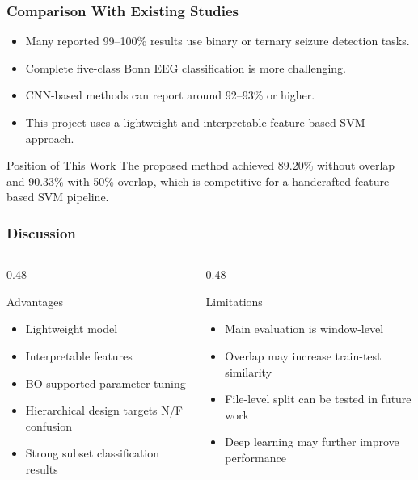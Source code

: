 \documentclass{beamer}
\begin{document}
\begin{frame}
\frametitle{Comparison With Existing Studies}
\begin{itemize}
\item Many reported 99--100\% results use binary or ternary seizure detection tasks.
\item Complete five-class Bonn EEG classification is more challenging.
\item CNN-based methods can report around 92--93\% or higher.
\item This project uses a lightweight and interpretable feature-based SVM approach.
\end{itemize}

\begin{block}{Position of This Work}
The proposed method achieved 89.20\% without overlap and 90.33\% with 50\% overlap, which is competitive for a handcrafted feature-based SVM pipeline.
\end{block}
\end{frame}

\begin{frame}
\frametitle{Discussion}
\begin{columns}
\begin{column}{0.48\textwidth}
\begin{block}{Advantages}
\begin{itemize}
\item Lightweight model
\item Interpretable features
\item BO-supported parameter tuning
\item Hierarchical design targets N/F confusion
\item Strong subset classification results
\end{itemize}
\end{block}
\end{column}

\begin{column}{0.48\textwidth}
\begin{block}{Limitations}
\begin{itemize}
\item Main evaluation is window-level
\item Overlap may increase train-test similarity
\item File-level split can be tested in future work
\item Deep learning may further improve performance
\end{itemize}
\end{block}
\end{column}
\end{columns}
\end{frame}
\end{document}
